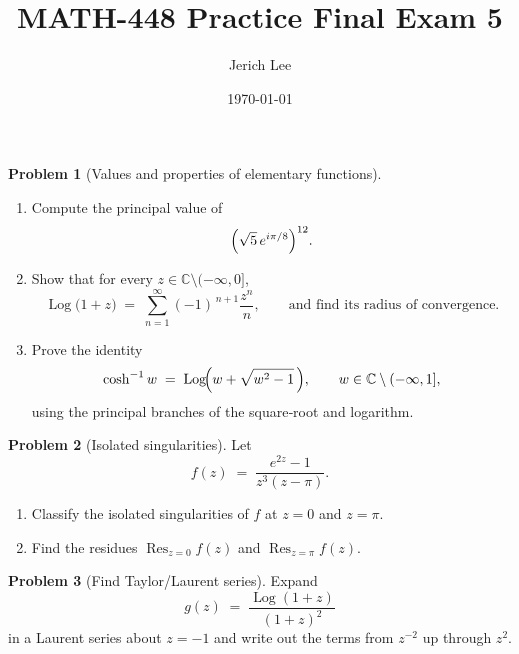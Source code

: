 \documentclass[12pt]{article}
\title{MATH-448 Practice Final Exam 5}
\author{Jerich Lee}
\date{\today}
\DeclareMathOperator{\Log}{Log}
\theoremstyle{definition} %
\newtheorem{problem}{Problem}
\theoremstyle{plain} %
\begin{document}
\maketitle
\pagebreak
  
  \begin{problem}[Values and properties of elementary functions]
  \begin{enumerate}[label=(\alph*),itemsep=6pt]
    \item Compute the principal value of
          \[
            \Bigl(\sqrt{5}\,e^{i\pi/8}\Bigr)^{12}.
          \]
    \item Show that for every $z\in\mathbb{C}\setminus(-\infty,0]$,
          \[
            \Log\!\bigl(1+z\bigr)
            \;=\;
            \sum_{n=1}^{\infty}(-1)^{\,n+1}\frac{z^{n}}{n},
            \qquad\text{and find its radius of convergence.}
          \]
    \item Prove the identity
          \[
            \cosh^{-1}w
            \;=\;
            \Log\!\Bigl(w+\sqrt{w^{2}-1}\,\Bigr),
            \qquad
            w\in\mathbb{C}\setminus(-\infty,1],
          \]
          using the principal branches of the square‑root and logarithm.
  \end{enumerate}
  \end{problem}
  
  \pagebreak
  
  \begin{problem}[Isolated singularities]
  Let
  \[
    f(z)\;=\;\frac{e^{2z}-1}{z^{3}(z-\pi)}.
  \]
  \begin{enumerate}[label=(\alph*),itemsep=6pt]
    \item Classify the isolated singularities of $f$ at $z=0$ and $z=\pi$.
    \item Find the residues $\operatorname*{Res}_{z=0}f(z)$ and $\operatorname*{Res}_{z=\pi}f(z)$.
  \end{enumerate}
  \end{problem}
  
  \pagebreak
  
  \begin{problem}[Find Taylor/Laurent series]
  Expand
  \[
    g(z)\;=\;\frac{\Log(1+z)}{(1+z)^{2}}
  \]
  in a Laurent series about $z=-1$ and write out the terms from $z^{-2}$ up through $z^{2}$.
  \end{problem}
  
\end{document}

